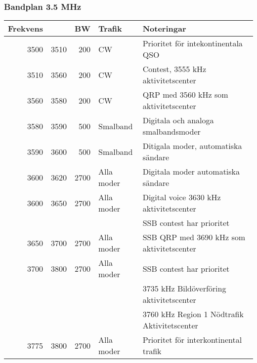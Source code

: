 \begin{landscape}
\subsubsection{Bandplan 3.5 MHz}
\begin{tabular}{rrrll}
\textbf{Frekvens} &      & \textbf{BW} & \textbf{Trafik} & \textbf{Noteringar}                          \\ \hline
3500              & 3510 & 200         & CW              & Prioritet för intekontinentala QSO \\ \hline
3510              & 3560 & 200         & CW              & Contest, 3555 kHz aktivitetscenter           \\ \hline
3560              & 3580 & 200         & CW              & QRP med 3560 kHz som aktivitetscenter        \\ \hline
3580              & 3590 & 500         & Smalband        & Digitala och analoga smalbandsmoder          \\ \hline
3590              & 3600 & 500         & Smalband        & Ditigala moder, automatiska sändare          \\ \hline
3600              & 3620 & 2700        & Alla moder      & Digitala moder automatiska sändare           \\ \hline
3600              & 3650 & 2700        & Alla moder      & Digital voice 3630 kHz aktivitetscenter      \\ 
                  &      &             &                 & SSB contest har prioritet                    \\ \hline
3650              & 3700 & 2700        & Alla moder      & SSB QRP med 3690 kHz som aktivitetscenter    \\ \hline
3700              & 3800 & 2700        & Alla moder      & SSB contest har prioritet                    \\
                  &      &             &                 & 3735 kHz Bildöverföring aktivitetscenter     \\
                  &      &             &                 & 3760 kHz Region 1 Nödtrafik Aktivitetscenter \\ \hline
3775              & 3800 & 2700        & Alla moder      & Prioritet för interkontinental trafik        \\ \hline
\end{tabular}
\clearpage


\end{landscape}

